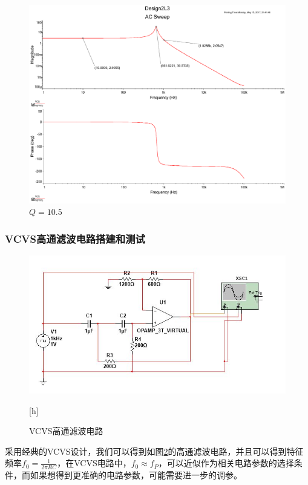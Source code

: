\documentclass[UTF8,a4paper]{paper}
\begin{document}
\begin{multicols}{3}
\begin{figure}[H]
\includegraphics[width=\columnwidth]{2L10_5.pdf}
\caption{$Q=10.5$}
\label{LQ10}
\end{figure}
\end{multicols}
\subsubsection{VCVS高通滤波电路搭建和测试}
\begin{figure}
\centering
\includegraphics[width=\textwidth]{H.jpg}
\caption{VCVS高通滤波电路}[h]
\label{H}
\end{figure}
采用经典的VCVS设计，我们可以得到如图\ref{H}的高通滤波电路，并且可以得到特征频率$f_0=\frac{1}{2\pi RC}$，在VCVS电路中，$f_0\approx f_P$，可以近似作为相关电路参数的选择条件，而如果想得到更准确的电路参数，可能需要进一步的调参。
\end{document}
